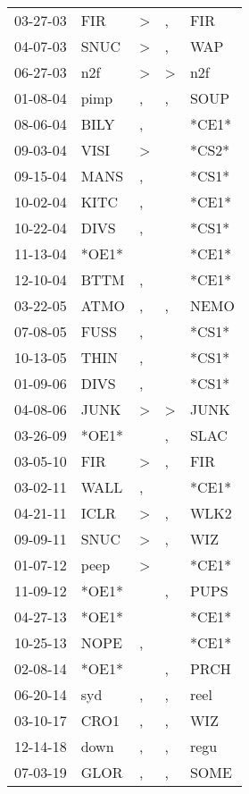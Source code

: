 \begin{supertabular}{lllll}
 03-27-03 &    FIR &  \textgreater &             , &    FIR \\
 04-07-03 &   SNUC &  \textgreater &             , &    WAP \\
 06-27-03 &    n2f &  \textgreater &  \textgreater &    n2f \\
 01-08-04 &   pimp &             , &             , &   SOUP \\
 08-06-04 &   BILY &             , &               &  *CE1* \\
 09-03-04 &   VISI &  \textgreater &               &  *CS2* \\
 09-15-04 &   MANS &             , &               &  *CS1* \\
 10-02-04 &   KITC &             , &               &  *CE1* \\
 10-22-04 &   DIVS &             , &               &  *CS1* \\
 11-13-04 &  *OE1* &               &               &  *CE1* \\
 12-10-04 &   BTTM &             , &               &  *CE1* \\
 03-22-05 &   ATMO &             , &             , &   NEMO \\
 07-08-05 &   FUSS &             , &               &  *CS1* \\
 10-13-05 &   THIN &             , &               &  *CS1* \\
 01-09-06 &   DIVS &             , &               &  *CS1* \\
 04-08-06 &   JUNK &  \textgreater &  \textgreater &   JUNK \\
 03-26-09 &  *OE1* &               &             , &   SLAC \\
 03-05-10 &    FIR &  \textgreater &             , &    FIR \\
 03-02-11 &   WALL &             , &               &  *CE1* \\
 04-21-11 &   ICLR &  \textgreater &             , &   WLK2 \\
 09-09-11 &   SNUC &  \textgreater &             , &    WIZ \\
 01-07-12 &   peep &  \textgreater &               &  *CE1* \\
 11-09-12 &  *OE1* &               &             , &   PUPS \\
 04-27-13 &  *OE1* &               &               &  *CE1* \\
 10-25-13 &   NOPE &             , &               &  *CE1* \\
 02-08-14 &  *OE1* &               &             , &   PRCH \\
 06-20-14 &    syd &             , &             , &   reel \\
 03-10-17 &   CRO1 &             , &             , &    WIZ \\
 12-14-18 &   down &             , &             , &   regu \\
 07-03-19 &   GLOR &             , &             , &   SOME \\
\end{supertabular}
